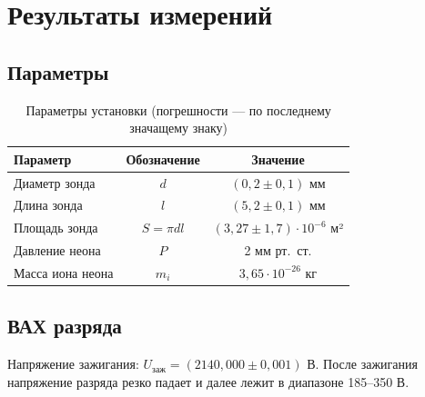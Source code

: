 \documentclass[a4paper]{article}
\begin{document}
	\section{Результаты измерений}
	
	\subsection{Параметры}
	
	\begin{table}[h]
		\centering
		\caption{Параметры установки (погрешности — по последнему значащему знаку)}
		\label{tab:params}
		\begin{tabular}{|l|c|c|}
			\hline
			Параметр & Обозначение & Значение \\
			\hline
			Диаметр зонда & $d$ & $(0{,}2 \pm 0{,}1)$ мм \\
			\hline
			Длина зонда & $l$ & $(5{,}2 \pm 0{,}1)$ мм \\
			\hline
			Площадь зонда & $S = \pi d l$ & $(3{,}27 \pm 1{,}7)\cdot 10^{-6}$ м² \\
			\hline
			Давление неона & $P$ & 2 мм рт.~ст. \\
			\hline
			Масса иона неона & $m_i$ & $3{,}65\cdot 10^{-26}$ кг \\
			\hline
		\end{tabular}
	\end{table}
	
	\subsection{ВАХ разряда}
	
	Напряжение зажигания: $U_{\text{заж}} = (2140{,}000 \pm 0{,}001)$ В. После зажигания напряжение разряда резко падает и далее лежит в диапазоне 185--350 В.
	
\end{document}
